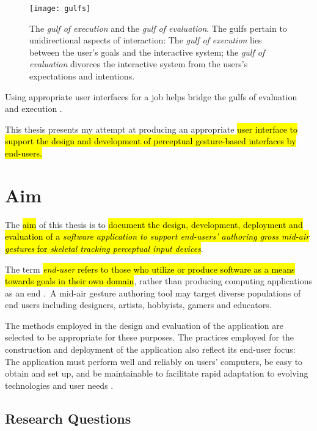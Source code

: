 \begin{SCfigure}[\sidecaptionrelwidth][ht]
\centering
\texttt{[image: gulfs]}
\caption{The \emph{gulf of execution} and the \emph{gulf of evaluation}. The gulfs pertain to unidirectional aspects of interaction: The \emph{gulf of execution} lies between the user's goals and the interactive system; the \emph{gulf of evaluation} divorces the interactive system from the users's expectations and intentions.}
\label{fig:gulfs}
\end{SCfigure}

Using appropriate user interfaces for a job helps bridge the gulfs of evaluation and execution \parencite{Norman:2002}.

This thesis presents my attempt at producing an appropriate \hl{user interface to support the design and development of perceptual gesture-based interfaces by end-users.}

\section{Aim} %

The \hl{aim} of this thesis is to \hl{document the design, development, deployment and evaluation of a \emph{software application to support end-users' authoring gross mid-air gestures} for \emph{skeletal tracking perceptual input devices}}.

The term \hl{\emph{end-user} refers to those who utilize or produce software as a means towards goals in their own domain}, rather than producing computing applications as an end \parencite{Ko:2011}.\ A mid-air gesture authoring tool may target diverse populations of end users including designers, artists, hobbyists, gamers and educators.

The methods employed in the design and evaluation of the application are selected to be appropriate for these purposes. The practices employed for the construction and deployment of the application also reflect its end-user focus: The application must perform well and reliably on users' computers, be easy to obtain and set up, and be maintainable to facilitate rapid adaptation to evolving technologies and user needs \parencite{McConnell:2009, Brooks:1995}.

\subsection{Research Questions} %

